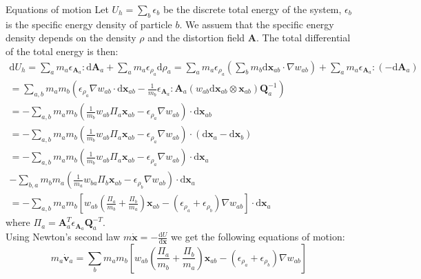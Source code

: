 \documentclass[oneside, a4paper, onecolumn, 11pt]{article}
\renewcommand{\AA}{\mathbf{A}}
\newcommand{\vv}{\mathbf{v}}
\newcommand{\xx}{\mathbf{x}}
\newcommand{\diff}{\mathrm{d}}
\newcommand{\QQ}{\mathbf{Q}}
\begin{document}
\begin{subsection} {Equations of motion}
Let $U_h = \sum_b \epsilon_b$ be the discrete total energy of the system, $\epsilon_b$ is the specific energy 
density of particle $b$. We assuem that the specific energy density depends on the density $\rho$ and the 
distortion field $\AA$. The total differential of the total energy is then: 
\begin{equation}
    \begin{aligned} 
    \diff U_h = \sum_a m_a \epsilon_{\AA_a} : \diff \AA_a + \sum_a m_a \epsilon_{\rho_a} \diff \rho_a
    = \sum_a m_a \epsilon_{\rho_a} \left( \sum_b m_b \diff \xx_{ab} \cdot \nabla w_{ab} \right)
    + \sum_a m_a \epsilon_{\AA_a} : \left( - \diff \AA_a \right) \\
    = \sum_{a,b} m_a m_b  \left( \epsilon_{\rho_a} \nabla w_{ab} \cdot \diff 
    \xx_{ab} - \frac{1}{m_b} \epsilon_{\AA_a} : \AA_a 
    \left( w_{ab} \diff \xx_{ab} \otimes \xx_{ab}\right) \QQ_a^{-1}
    \right) \\
    = -\sum_{a,b} m_a m_b \left(\frac{1}{m_b} w_{ab} \Pi_a \xx_{ab} - 
    \epsilon_{\rho_a} \nabla w_{ab}  \right) \cdot \diff \xx_{ab}\\
    = -\sum_{a,b} m_a m_b \left(\frac{1}{m_b} w_{ab} \Pi_a \xx_{ab} - 
    \epsilon_{\rho_a} \nabla w_{ab}  \right) \cdot \left(\diff \xx_a - \diff \xx_b\right)\\
    = -\sum_{a,b} m_a m_b \left(\frac{1}{m_b} w_{ab} \Pi_a \xx_{ab} - 
    \epsilon_{\rho_a} \nabla w_{ab}  \right) \cdot \diff \xx_a \\
    - \sum_{b,a} m_b m_a \left(\frac{1}{m_a} w_{ba} \Pi_b \xx_{ab} - 
    \epsilon_{\rho_b} \nabla w_{ab}  \right) \cdot \diff \xx_a\\ 
    = -\sum_{a,b} m_a m_b \left[ w_{ab} \left( \frac{\Pi_a}{m_b} + \frac{\Pi_b}{m_a} \right) \xx_{ab} 
    - \left( \epsilon_{\rho_a} + \epsilon_{\rho_b} \right) 
    \nabla w_{ab} \right] \cdot \diff \xx_a
    \end{aligned}
\end{equation} where $\Pi_a = \AA_a^T \epsilon_{\AA_a} \QQ_a^{-T}$.\\ 
Using Newton's second law $m \dot{\xx} = - \frac{\diff U}{\diff \xx}$ we get the following equations of motion: 
\begin{equation} 
    m_a \dot{\vv}_a = \sum_b m_a m_b \left[ w_{ab} \left( \frac{\Pi_a}{m_b} + \frac{\Pi_b}{m_a}\right) 
    \xx_{ab} - \left( \epsilon_{\rho_a} +
    \epsilon_{\rho_b} \right) \nabla w_{ab} \right] 
\end{equation} 


\end{subsection}
\end{document}
